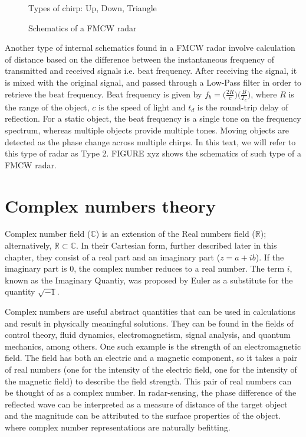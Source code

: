\begin{figure}[htb]
	\centering
	\epsfxsize=4.5cm
	{}
	{}
	{}
	\caption{Types of chirp: Up, Down, Triangle}
	\label{fig:chirps}
\end{figure}

\begin{figure}[htb]
	\centering
	\epsfxsize=14cm
	{}
	\caption{Schematics of a FMCW radar}
	\label{fig:fmcwrad}
\end{figure}

Another type of internal schematics found in a FMCW radar involve calculation of distance based on the difference between the instantaneous frequency of transmitted and received signals i.e. beat frequency. After receiving the signal, it is mixed with the original signal, and passed through a Low-Pass filter in order to retrieve the beat frequency. Beat frequency is given by $f_b=\bigg(\frac{2R}{c}\bigg)\bigg(\frac{B}{T_c}\bigg)$, where $R$ is the range of the object, $c$ is the speed of light and $t_d$ is the round-trip delay of reflection. For a static object, the beat frequency is a single tone on the frequency spectrum, whereas multiple objects provide multiple tones. Moving objects are detected as the phase change across multiple chirps. In this text, we will refer to this type of radar as Type 2. FIGURE xyz shows the schematics of such type of a FMCW radar.  

\section{Complex numbers theory}

Complex number field ($\mathbb{C}$) is an extension of the Real numbers field ($\mathbb{R}$); alternatively, $\mathbb{R}\subset\mathbb{C}$. In their Cartesian form, further described later in this chapter, they consist of a real part and an imaginary part ($z=a+ib$). If the imaginary part is $0$, the complex number reduces to a real number. The term $i$, known as the Imaginary Quantiy, was proposed by Euler as a substitute for the quantity $\sqrt{-1}$. 

Complex numbers are useful abstract quantities that can be used in calculations and result in physically meaningful solutions. They can be found in the fields of control theory, fluid dynamics, electromagnetism, signal analysis, and quantum mechanics, among others.
One such example is the strength of an electromagnetic field. The field has both an electric and a magnetic component, so it takes a pair of real numbers (one for the intensity of the electric field, one for the intensity of the magnetic field) to describe the field strength. This pair of real numbers can be thought of as a complex number. In radar-sensing, the phase difference of the reflected wave can be interpreted as a measure of distance of the target object and the magnitude can be attributed to the surface properties of the object. 
where complex number representations are naturally befitting. 

